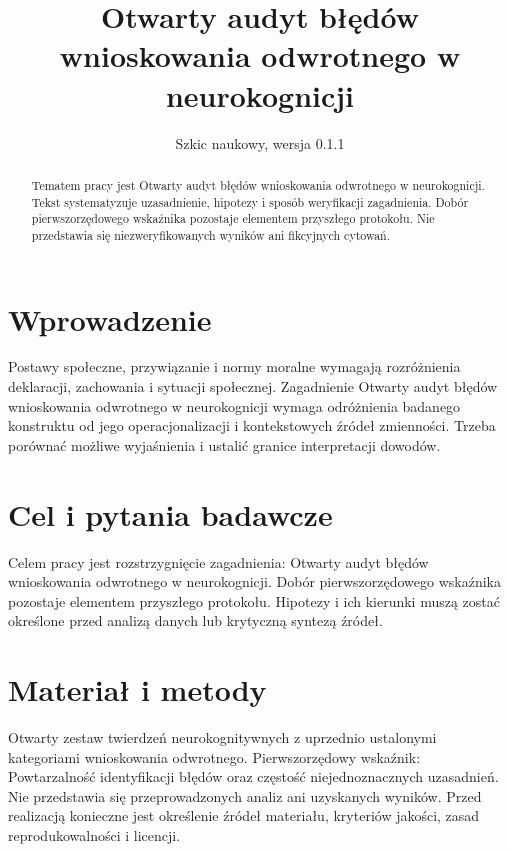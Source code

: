 \documentclass[11pt,a4paper]{article}
\title{Otwarty audyt błędów wnioskowania odwrotnego w neurokognicji}
\author{}
\date{Szkic naukowy, wersja 0.1.1}
\begin{document}
\maketitle

\begin{abstract}

Tematem pracy jest Otwarty audyt błędów wnioskowania odwrotnego w neurokognicji. Tekst systematyzuje uzasadnienie, hipotezy i sposób weryfikacji zagadnienia. Dobór pierwszorzędowego wskaźnika pozostaje elementem przyszłego protokołu. Nie przedstawia się niezweryfikowanych wyników ani fikcyjnych cytowań.

\end{abstract}

\section{Wprowadzenie}

Postawy społeczne, przywiązanie i normy moralne wymagają rozróżnienia deklaracji, zachowania i sytuacji społecznej. Zagadnienie Otwarty audyt błędów wnioskowania odwrotnego w neurokognicji wymaga odróżnienia badanego konstruktu od jego operacjonalizacji i kontekstowych źródeł zmienności. Trzeba porównać możliwe wyjaśnienia i ustalić granice interpretacji dowodów.

\section{Cel i pytania badawcze}

Celem pracy jest rozstrzygnięcie zagadnienia: Otwarty audyt błędów wnioskowania odwrotnego w neurokognicji. Dobór pierwszorzędowego wskaźnika pozostaje elementem przyszłego protokołu. Hipotezy i ich kierunki muszą zostać określone przed analizą danych lub krytyczną syntezą źródeł.

\section{Materiał i metody}

Otwarty zestaw twierdzeń neurokognitywnych z uprzednio ustalonymi kategoriami wnioskowania odwrotnego. Pierwszorzędowy wskaźnik: Powtarzalność identyfikacji błędów oraz częstość niejednoznacznych uzasadnień. Nie przedstawia się przeprowadzonych analiz ani uzyskanych wyników. Przed realizacją konieczne jest określenie źródeł materiału, kryteriów jakości, zasad reprodukowalności i licencji.
\end{document}
